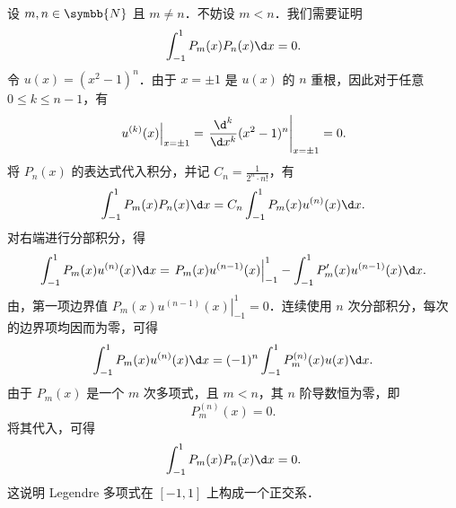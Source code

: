 \begin{myproof}
    设 $m, n \in \symbb{N}$ 且 $m \neq n$．不妨设 $m < n$．我们需要证明
    \begin{equation}\label{eq:orth-target-7}
        \int_{-1}^{1} P_m(x) P_n(x) \d x = 0.
    \end{equation}
    令 $u(x) = (x^2 - 1)^n$．由于 $x = \pm 1$ 是 $u(x)$ 的 $n$ 重根，因此对于任意 $0 \leqslant k \leqslant n-1$，有
    \begin{equation}\label{eq:boundary-zero-7}
        \left. u^{(k)}(x) \right|_{x=\pm 1} = \left. \frac{\d^k}{\d x^k} (x^2 - 1)^n \right|_{x=\pm 1} = 0.
    \end{equation}
    将 $P_n(x)$ 的表达式代入积分，并记 $C_n = \frac{1}{2^n \cdot n!}$，有
    \begin{equation}\label{eq:integral-step1-7}
        \int_{-1}^{1} P_m(x) P_n(x) \d x = C_n \int_{-1}^{1} P_m(x) u^{(n)}(x) \d x.
    \end{equation}
    对右端进行分部积分，得
    \begin{equation}\label{eq:parts-step1-7}
        \int_{-1}^{1} P_m(x) u^{(n)}(x) \d x = \left. P_m(x) u^{(n-1)}(x) \right|_{-1}^{1} - \int_{-1}^{1} P'_m(x) u^{(n-1)}(x) \d x.
    \end{equation}
    由，第一项边界值 $\left. P_m(x) u^{(n-1)}(x) \right|_{-1}^{1} = 0$．连续使用 $n$ 次分部积分，每次的边界项均因而为零，可得
    \begin{equation}\label{eq:parts-n-7}
        \int_{-1}^{1} P_m(x) u^{(n)}(x) \d x = (-1)^n \int_{-1}^{1} P_m^{(n)}(x) u(x) \d x.
    \end{equation}
    由于 $P_m(x)$ 是一个 $m$ 次多项式，且 $m < n$，其 $n$ 阶导数恒为零，即
    \begin{equation}\label{eq:deriv-zero-7}
        P_m^{(n)}(x) = 0.
    \end{equation}
    将其代入，可得
    \begin{equation}\label{eq:orth-result-7}
        \int_{-1}^{1} P_m(x) P_n(x) \d x = 0.
    \end{equation}
    这说明 Legendre 多项式在 $[-1, 1]$ 上构成一个正交系．
\end{myproof}

